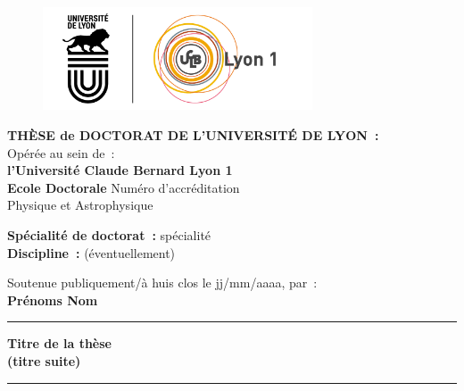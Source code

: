 \documentclass{article}
\begin{document}
\begin{titlepage}

\unitlength 1cm
\begin{center}

\vspace*{-2.5cm}
\begin{figure}[h]
    \centering
    \includegraphics[width=8cm]{logos.png}
\end{figure}



           {\large\bf THÈSE de DOCTORAT DE L'UNIVERSITÉ DE LYON~:\\}
           {Opérée au sein de~:\\}
           {\large \bf l'Université Claude Bernard Lyon 1\\}
\vspace{12pt}
           {\large \textbf{Ecole Doctorale} Numéro d'accréditation \\Physique et Astrophysique}


\vspace{12pt}

           {\large \textbf{Spécialité de doctorat~:} spécialité \\}
           {\large \textbf{Discipline~:} (éventuellement)}

\vspace{0.8cm}

           {Soutenue publiquement/à huis clos le jj/mm/aaaa, par~:\\}
           {\Large\bf {Prénoms Nom}}
\vspace{0.5cm}           


\rule{5cm}{1pt}

\vspace{12pt}
           
           {\LARGE \bf Titre de la thèse}\\
           \vspace{0.3cm}
           {\Large \bf (titre suite)}
           
\vspace{12pt}
\rule{5cm}{1pt}

\vspace{0.5cm}


\end{center}
\end{titlepage}
\end{document}
